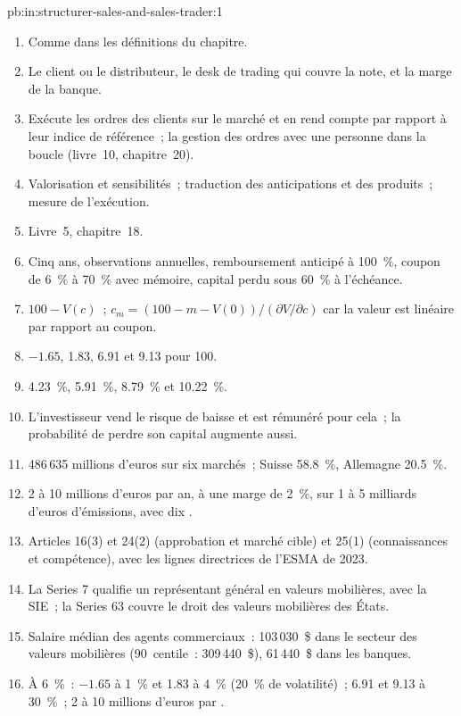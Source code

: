 \begin{solution}{pb:in:structurer-sales-and-sales-trader:1}
\begin{enumerate}
\item Comme dans les définitions du chapitre.
\item Le client ou le distributeur, le desk de trading qui couvre la note, et la marge de la banque.
\item Exécute les ordres des clients sur le marché et en rend compte par rapport à leur indice de référence~; la gestion des ordres avec une personne dans la boucle
(livre~10, chapitre~20).
\item Valorisation et sensibilités~; traduction des anticipations et des produits~; mesure de l'exécution.
\item Livre~5, chapitre~18.
\item Cinq ans, observations annuelles, remboursement anticipé à 100~\%, coupon de 6~\% à 70~\% avec mémoire, capital perdu sous 60~\% à
l'échéance.
\item $100-V(c)$~; $c_m=(100-m-V(0))/(\partial V/\partial c)$ car la valeur est linéaire par rapport au coupon.
\item $-1.65$, 1.83, 6.91 et 9.13 pour 100.
\item 4.23~\%, 5.91~\%, 8.79~\% et 10.22~\%.
\item L'investisseur vend le risque de baisse et est rémunéré pour cela~; la probabilité de perdre son capital augmente aussi.
\item 486\,635 millions d'euros sur six marchés~; Suisse 58.8~\%, Allemagne 20.5~\%.
\item 2 à 10 millions d'euros par an, à une marge de 2~\%, sur 1 à 5 milliards d'euros d'émissions, avec dix .
\item Articles 16(3) et 24(2) (approbation et marché cible) et 25(1) (connaissances et compétence), avec les
lignes directrices de l'ESMA de 2023.
\item La Series 7 qualifie un représentant général en valeurs mobilières, avec la SIE~; la Series 63 couvre le droit des valeurs mobilières des États.
\item Salaire médian des agents commerciaux~: 103\,030~\$ dans le secteur des valeurs mobilières (90~centile~: 309\,440~\$), 61\,440~\$ dans les banques.
\item À 6~\%~: $-1.65$ à 1~\% et 1.83 à 4~\% (20~\% de volatilité)~; 6.91 et 9.13 à 30~\%~; 2 à 10 millions d'euros par
.

\end{enumerate}
\end{solution}
